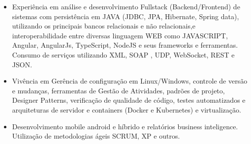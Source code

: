 \documentclass[10pt,a4paper]{altacv}
\begin{document}



\begin{fullwidth}
\makecvheader
\end{fullwidth}

\begin{itemize}
\item Experiência em análise e desenvolvimento Fullstack (Backend/Frontend) de sistemas com persistência em JAVA (JDBC, JPA, Hibernate,  Spring data), utilizando os principais bancos relacionais e não relacionais,e interoperabilidade entre diversas linguagem WEB como JAVASCRIPT, Angular, AngularJs, TypeScript, NodeJS e seus frameworks e ferramentas. Consumo de serviços utilizando XML, SOAP , UDP, WebSocket, REST e JSON. 
\item Vivência em Gerência de configuração em Linux/Windows, controle de versão e mudanças, ferramentas de Gestão de Atividades, padrões de projeto, Designer Patterns, verificação de qualidade de código, testes automatizados e arquiteturas de servidor e containers (Docker e Kubernetes) e virtualização. 
\item Desenvolvimento mobile android e híbrido e relatórios business inteligence. Utilização de metodologias ágeis SCRUM, XP e outros. 
\end{itemize}
\end{document}
